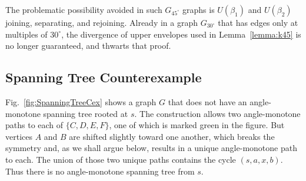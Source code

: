 \documentclass{cccg17}
\newcommand{\bluenew}[1]{{#1}}  %
\newcommand{\cyannew}[1]{{#1}}  %
\newcommand{\rednote}[1]{{}}  %
\newcommand{\figlab}[1]{\label{fig:#1}}
\newcommand{\seclab}[1]{\label{sec:#1}}
\newcommand{\lemref}[1]{\ref{lemma:#1}}
\newcommand{\figref}[1]{\ref{fig:#1}}
\def\b{{\beta}}
\begin{document}
\medskip
\noindent
\bluenew{The problematic possibility avoided in such $G_{45^\circ}$ graphs
is $U(\b_1)$ and $U(\b_2)$ joining, separating, and rejoining.}
Already in a graph $G_{30^\circ}$ that has edges only at multiples of $30^\circ$,
the divergence of upper envelopes used in Lemma~\lemref{k45} is no longer
guaranteed, and thwarts that proof.

\rednote{JOR:
I flipped Fig.~\figref{Ubeta_k45} horizontally to save space, but if
we cannot fit into $6$ pages, this figure could go.}

\subsection{Spanning Tree Counterexample}
\seclab{Cex}
Fig.~\figref{SpanningTreeCex} shows a graph $G$ that does not have
an angle-monotone spanning tree rooted at $s$.
The construction allows two \cyannew{angle-monotone} paths to each of $\{C,D,E,F\}$, one of which is
marked green in the figure. But vertices $A$ and $B$ are shifted slightly
toward one another, which breaks the symmetry and, \cyannew{as we shall argue below}, results in a unique angle-monotone path to each. 
\bluenew{The union of those two unique paths contains the cycle $(s,a,x,b)$.}
\cyannew{Thus there is no angle-monotone spanning tree from $s$.}
\end{document}
